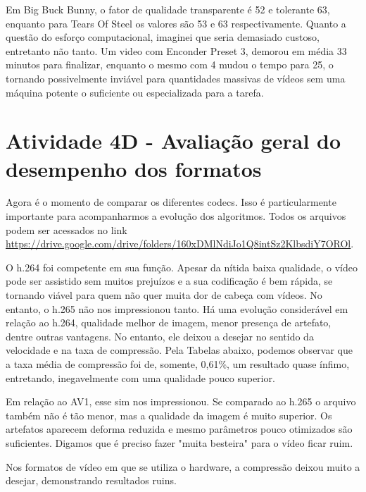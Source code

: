 \paragrafo Em Big Buck Bunny, o fator de qualidade transparente é 52 e tolerante 63, enquanto para Tears Of Steel os valores são 53 e 63 respectivamente. Quanto a questão do esforço computacional, imaginei que seria demasiado custoso, entretanto não tanto. Um video com Enconder Preset 3, demorou em média 33 minutos para finalizar, enquanto o mesmo com 4 mudou o tempo para 25, o tornando possivelmente inviável para quantidades massivas de vídeos sem uma máquina potente o suficiente ou especializada para a tarefa.



\section{Atividade 4D - Avaliação geral do desempenho dos formatos}
Agora é o momento de comparar os diferentes codecs. Isso é particularmente importante para acompanharmos a evolução dos algoritmos. Todos os arquivos podem ser acessados no link \url{https://drive.google.com/drive/folders/160xDMlNdiJo1Q8intSz2KlbsdiY7OROl}.

\paragrafo O h.264 foi competente em sua função. Apesar da nítida baixa qualidade, o vídeo pode ser assistido sem muitos prejuízos e a sua codificação é bem rápida, se tornando viável para quem não quer muita dor de cabeça com vídeos. No entanto, o h.265 não nos impressionou tanto. Há uma evolução considerável em relação ao h.264, qualidade melhor de imagem, menor presença de artefato, dentre outras vantagens. No entanto, ele deixou a desejar no sentido da velocidade e na taxa de compressão. Pela Tabelas abaixo, podemos observar que a taxa média de compressão foi de, somente, 0,61\%, um resultado quase ínfimo, entretando, inegavelmente com uma qualidade pouco superior.

\paragrafo Em relação ao AV1, esse sim nos impressionou. Se comparado ao h.265 o arquivo também não é tão menor, mas a qualidade da imagem é muito superior. Os artefatos aparecem deforma reduzida e mesmo parâmetros pouco otimizados são suficientes. Digamos que é preciso fazer "muita besteira" para o vídeo ficar ruim.

\paragrafo Nos formatos de vídeo em que se utiliza o hardware, a compressão deixou muito a desejar, demonstrando resultados ruins.


